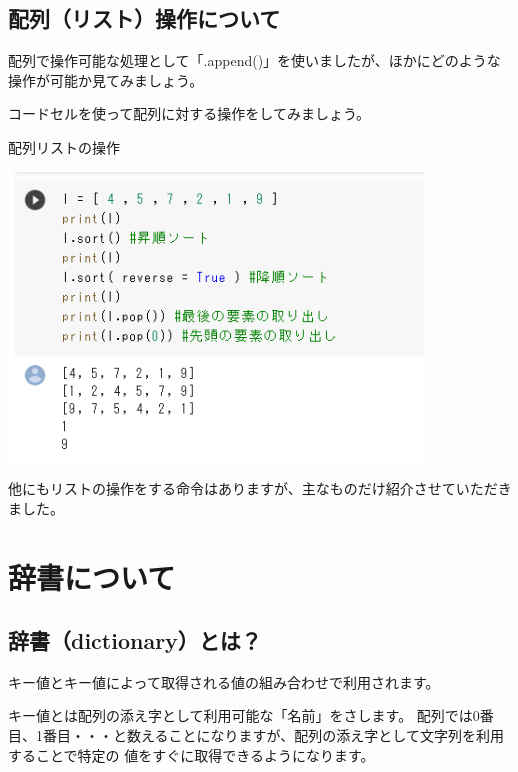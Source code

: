 \documentclass[11pt,a4paper,dvipdfmx,titlepage]{jsreport}
\begin{document}
\subsection{配列（リスト）操作について}
配列で操作可能な処理として「.append()」を使いましたが、ほかにどのような操作が可能か見てみましょう。

 {\gt コードセル}を使って配列に対する操作をしてみましょう。

\begin{grabox}{配列リストの操作}

\includegraphics[width=11cm]{images/colab25.png}
\end{grabox}
他にもリストの操作をする命令はありますが、主なものだけ紹介させていただきました。
\newpage
\section{辞書について}
\subsection{辞書（dictionary）とは？}

キー値とキー値によって取得される値の組み合わせで利用されます。

キー値とは配列の添え字として利用可能な「名前」をさします。
配列では0番目、1番目・・・と数えることになりますが、配列の添え字として文字列を利用することで特定の
値をすぐに取得できるようになります。
\end{document}
